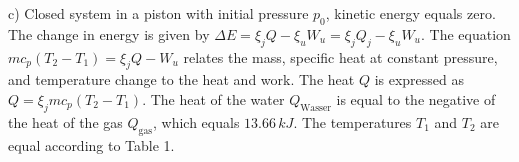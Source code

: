 c) Closed system in a piston with initial pressure \( p_0 \), kinetic energy equals zero. The change in energy is given by \( \Delta E = \xi_j Q - \xi_u W_u = \xi_j Q_j - \xi_u W_u \). The equation \( m c_p (T_2 - T_1) = \xi_j Q - W_u \) relates the mass, specific heat at constant pressure, and temperature change to the heat and work. The heat \( Q \) is expressed as \( Q = \xi_j m c_p (T_2 - T_1) \). The heat of the water \( Q_{\text{Wasser}} \) is equal to the negative of the heat of the gas \( Q_{\text{gas}} \), which equals \( 13.66 \, kJ \). The temperatures \( T_1 \) and \( T_2 \) are equal according to Table 1.
